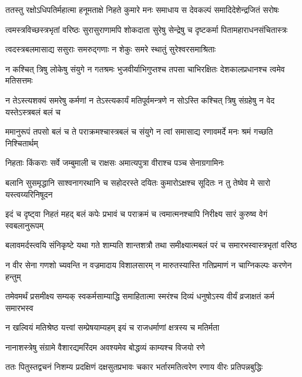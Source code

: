 
\twolineshloka
{ततस्तु रक्षोऽधिपतिर्महात्मा हनूमताक्षे निहते कुमारे}
{मनः समाधाय स देवकल्पं समादिदेशेन्द्रजितं सरोषः} %

\twolineshloka
{त्वमस्त्रविच्छस्त्रभृतां वरिष्ठः सुरासुराणामपि शोकदाता}
{सुरेषु सेन्द्रेषु च दृष्टकर्मा पितामहाराधनसंचितास्त्रः} %

\twolineshloka
{त्वदस्त्रबलमासाद्य ससुराः समरुद्गणाः}
{न शेकुः समरे स्थातुं सुरेश्वरसमाश्रिताः} %

\threelineshloka
{न कश्चित् त्रिषु लोकेषु संयुगे न गतश्रमः}
{भुजवीर्याभिगुप्तश्च तपसा चाभिरक्षितः}
{देशकालप्रधानश्च त्वमेव मतिसत्तमः} %

\twolineshloka
{न तेऽस्त्यशक्यं समरेषु कर्मणां न तेऽस्त्यकार्यं मतिपूर्वमन्त्रणे}
{न सोऽस्ति कश्चित् त्रिषु संग्रहेषु न वेद यस्तेऽस्त्रबलं बलं च} %

\twolineshloka
{ममानुरूपं तपसो बलं च ते पराक्रमश्चास्त्रबलं च संयुगे}
{न त्वां समासाद्य रणावमर्दे मनः श्रमं गच्छति निश्चितार्थम्} %

\twolineshloka
{निहताः किंकराः सर्वे जम्बुमाली च राक्षसः}
{अमात्यपुत्रा वीराश्च पञ्च सेनाग्रगामिनः} %

\threelineshloka
{बलानि सुसमृद्धानि साश्वनागरथानि च}
{सहोदरस्ते दयितः कुमारोऽक्षश्च सूदितः}
{न तु तेष्वेव मे सारो यस्त्वय्यरिनिषूदन} %

\twolineshloka
{इदं च दृष्ट्वा निहतं महद् बलं कपेः प्रभावं च पराक्रमं च}
{त्वमात्मनश्चापि निरीक्ष्य सारं कुरुष्व वेगं स्वबलानुरूपम्} %

\twolineshloka
{बलावमर्दस्त्वयि संनिकृष्टे यथा गते शाम्यति शान्तशत्रौ}
{तथा समीक्ष्यात्मबलं परं च समारभस्वास्त्रभृतां वरिष्ठ} %

\twolineshloka
{न वीर सेना गणशो च्यवन्ति न वज्रमादाय विशालसारम्}
{न मारुतस्यास्ति गतिप्रमाणं न चाग्निकल्पः करणेन हन्तुम्} %

\twolineshloka
{तमेवमर्थं प्रसमीक्ष्य सम्यक् स्वकर्मसाम्याद्धि समाहितात्मा}
{स्मरंश्च दिव्यं धनुषोऽस्य वीर्यं व्रजाक्षतं कर्म समारभस्व} %

\twolineshloka
{न खल्वियं मतिश्रेष्ठ यत्त्वां सम्प्रेषयाम्यहम्}
{इयं च राजधर्माणां क्षत्रस्य च मतिर्मता} %

\twolineshloka
{नानाशस्त्रेषु संग्रामे वैशारद्यमरिंदम}
{अवश्यमेव बोद्धव्यं काम्यश्च विजयो रणे} %

\twolineshloka
{ततः पितुस्तद्वचनं निशम्य प्रदक्षिणं दक्षसुतप्रभावः}
{चकार भर्तारमतित्वरेण रणाय वीरः प्रतिपन्नबुद्धिः} %

